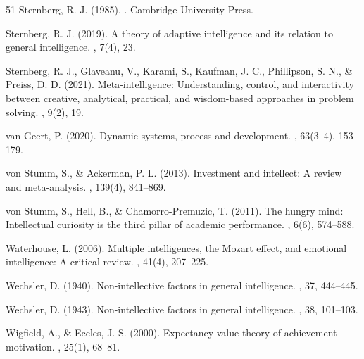 \documentclass[12pt,a4paper]{article}
\begin{document}
\begin{thebibliography}{51}
Sternberg, R. J. (1985).
.
\newblock Cambridge University Press.

Sternberg, R. J. (2019).
\newblock A theory of adaptive intelligence and its relation to general intelligence.
, 7(4), 23.

Sternberg, R. J., Glaveanu, V., Karami, S., Kaufman, J. C., Phillipson, S. N., \& Preiss, D. D. (2021).
\newblock Meta-intelligence: Understanding, control, and interactivity between creative, analytical, practical, and wisdom-based approaches in problem solving.
, 9(2), 19.

van Geert, P. (2020).
\newblock Dynamic systems, process and development.
, 63(3--4), 153--179.

von Stumm, S., \& Ackerman, P. L. (2013).
\newblock Investment and intellect: A review and meta-analysis.
, 139(4), 841--869.

von Stumm, S., Hell, B., \& Chamorro-Premuzic, T. (2011).
\newblock The hungry mind: Intellectual curiosity is the third pillar of academic performance.
, 6(6), 574--588.

Waterhouse, L. (2006).
\newblock Multiple intelligences, the Mozart effect, and emotional intelligence: A critical review.
, 41(4), 207--225.

Wechsler, D. (1940).
\newblock Non-intellective factors in general intelligence.
, 37, 444--445.

Wechsler, D. (1943).
\newblock Non-intellective factors in general intelligence.
, 38, 101--103.

Wigfield, A., \& Eccles, J. S. (2000).
\newblock Expectancy-value theory of achievement motivation.
, 25(1), 68--81.


\end{thebibliography}
\end{document}
